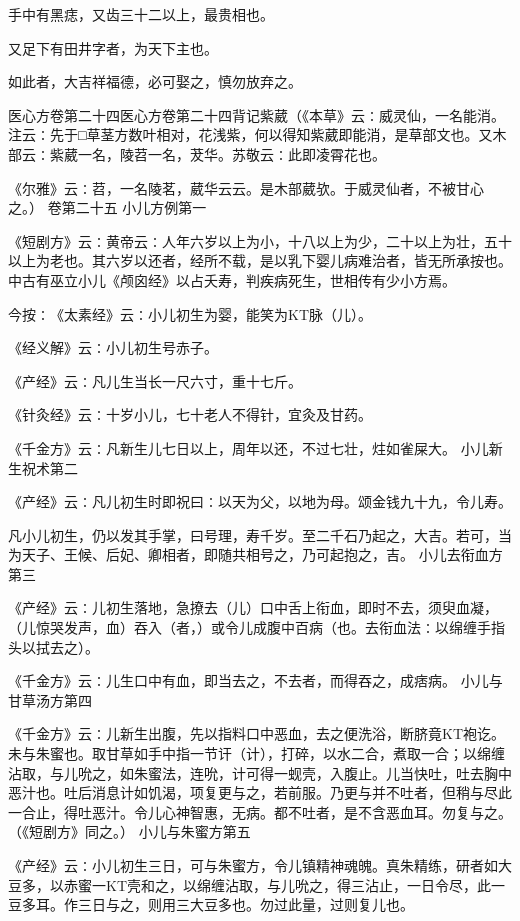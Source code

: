 \documentclass[a4paper,12pt,UTF8,twoside]{ctexbook}
\begin{document}
手中有黑痣，又齿三十二以上，最贵相也。

又足下有田井字者，为天下主也。

如此者，大吉祥福德，必可娶之，慎勿放弃之。

医心方卷第二十四医心方卷第二十四背记紫葳（《本草》云∶威灵仙，一名能消。注云∶先于□草茎方数叶相对，花浅紫，何以得知紫葳即能消，是草部文也。又木部云∶紫葳一名，陵苕一名，茇华。苏敬云∶此即凌霄花也。

《尔雅》云∶苕，一名陵茗，葳华云云。是木部葳欤。于威灵仙者，不被甘心之。）
卷第二十五
小儿方例第一

《短剧方》云∶黄帝云∶人年六岁以上为小，十八以上为少，二十以上为壮，五十以上为老也。其六岁以还者，经所不载，是以乳下婴儿病难治者，皆无所承按也。中古有巫立小儿《颅囟经》以占夭寿，判疾病死生，世相传有少小方焉。

今按∶《太素经》云∶小儿初生为婴，能笑为KT脉（儿）。

《经义解》云∶小儿初生号赤子。

《产经》云∶凡儿生当长一尺六寸，重十七斤。

《针灸经》云∶十岁小儿，七十老人不得针，宜灸及甘药。

《千金方》云∶凡新生儿七日以上，周年以还，不过七壮，炷如雀屎大。
小儿新生祝术第二

《产经》云∶凡儿初生时即祝曰∶以天为父，以地为母。颂金钱九十九，令儿寿。

凡小儿初生，仍以发其手掌，曰号理，寿千岁。至二千石乃起之，大吉。若可，当为天子、王候、后妃、卿相者，即随共相号之，乃可起抱之，吉。
小儿去衔血方第三

《产经》云∶儿初生落地，急撩去（儿）口中舌上衔血，即时不去，须臾血凝，（儿惊哭发声，血）吞入（者，）或令儿成腹中百病（也。去衔血法∶以绵缠手指头以拭去之）。

《千金方》云∶儿生口中有血，即当去之，不去者，而得吞之，成痞病。
小儿与甘草汤方第四

《千金方》云∶儿新生出腹，先以指料口中恶血，去之便洗浴，断脐竟KT袍讫。未与朱蜜也。取甘草如手中指一节讦（计），打碎，以水二合，煮取一合；以绵缠沾取，与儿吮之，如朱蜜法，连吮，计可得一蚬壳，入腹止。儿当快吐，吐去胸中恶汁也。吐后消息计如饥渴，项复更与之，若前服。乃更与并不吐者，但稍与尽此一合止，得吐恶汁。令儿心神智惠，无病。都不吐者，是不含恶血耳。勿复与之。（《短剧方》同之。）
小儿与朱蜜方第五

《产经》云∶小儿初生三日，可与朱蜜方，令儿镇精神魂魄。真朱精练，研者如大豆多，以赤蜜一KT壳和之，以绵缠沾取，与儿吮之，得三沾止，一日令尽，此一豆多耳。作三日与之，则用三大豆多也。勿过此量，过则复儿也。
\end{document}
